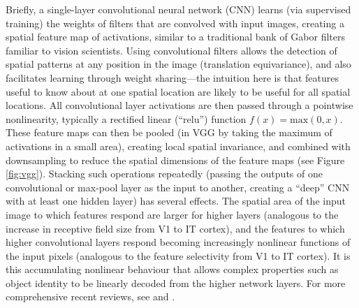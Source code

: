 \documentclass[article, 11pt,a4paper,natbib]{apa6}\usepackage[]{graphicx}\usepackage[]{color}
\begin{document}
Briefly, a single-layer convolutional neural network (CNN) learns (via supervised training) the weights of filters that are convolved with input images, creating a spatial feature map of activations, similar to a traditional bank of Gabor filters familiar to vision scientists.
Using convolutional filters allows the detection of spatial patterns at any position in the image (translation equivariance), and also facilitates learning through weight sharing---the intuition here is that features useful to know about at one spatial location are likely to be useful for all spatial locations.
All convolutional layer activations are then passed through a pointwise nonlinearity, typically a rectified linear (``relu'') function $f(x) = \mathrm{max}(0, x)$.
These feature maps can then be pooled (in VGG by taking the maximum of activations in a small area), creating local spatial invariance, and combined with downsampling to reduce the spatial dimensions of the feature maps (see Figure \ref{fig:vgg}).
Stacking such operations repeatedly (passing the outputs of one convolutional or max-pool layer as the input to another, creating a ``deep'' CNN with at least one hidden layer) has several effects. 
The spatial area of the input image to which features respond are larger for higher layers (analogous to the increase in receptive field size from V1 to IT cortex), and the features to which higher convolutional layers respond becoming increasingly nonlinear functions of the input pixels (analogous to the feature selectivity from V1 to IT cortex).
It is this accumulating nonlinear behaviour that allows complex properties such as object identity \citep[and many other properties;][]{hong_explicit_2016} to be linearly decoded from the higher network layers.
For more comprehensive recent reviews, see \citet{lecun_deep_2015, kietzmann_deep_2017} and \citet{yamins_using_2016}.
\end{document}

